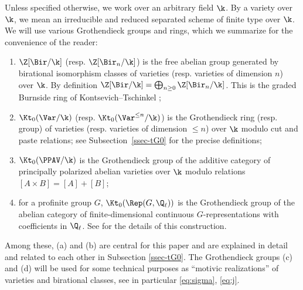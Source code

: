 Unless specified otherwise, we work over an arbitrary field $\k$.
By a variety over $\k$,
we mean
an
irreducible
and reduced separated
scheme
of finite type over $\k$.
We will use various Grothendieck groups and rings, which we summarize for the convenience of the reader:
\begin{enumerate}
\item[(a)] $\Z[\Bir/\k]$ (resp. $\Z[\Bir_n/\k]$)
is the free abelian group generated by birational isomorphism classes of varieties
(resp. varieties of dimension $n$)
over $\k$.
By definition
$\Z[\Bir/\k] = \bigoplus_{n \ge 0}
\Z[\Bir_n/\k]$. This is the graded Burnside ring of Kontsevich--Tschinkel \cite{KontsevichTschinkel};
\item[(b)] $\Kt_0(\Var/\k)$
(resp. $\Kt_0(\Var^{\le n}/\k)$)
is the Grothendieck ring (resp. group)
of varieties (resp. varieties of dimension $\le n$)
over $\k$
modulo cut and paste relations;
see Subsection~\ref{ssec-tG0} for the precise definitions;
\item[(c)] $\Kt_0(\PPAV/\k)$ is the Grothendieck group of the additive category of
principally polarized abelian varieties over $\k$
modulo relations $[A \times B] = [A] + [B]$;
\item[(d)] for a profinite group
$G$, $\Kt_0(\Rep(G, \Q_\ell))$
is the Grothendieck group of
the abelian category of
finite-dimensional
continuous $G$-representations
with coefficients in $\Q_\ell$. See \cite[Section 2.1]{LSZ20} for the details of this construction.
\end{enumerate}
Among these,  (a) and (b)
are central for this paper and
are explained in detail and
related to each other in Subsection \ref{ssec-tG0}.
The Grothendieck groups (c) and (d)
will be used for some technical purposes
as ``motivic realizations'' of varieties and birational classes,
see in particular \eqref{eq:sigma}, \eqref{eq:j}.

